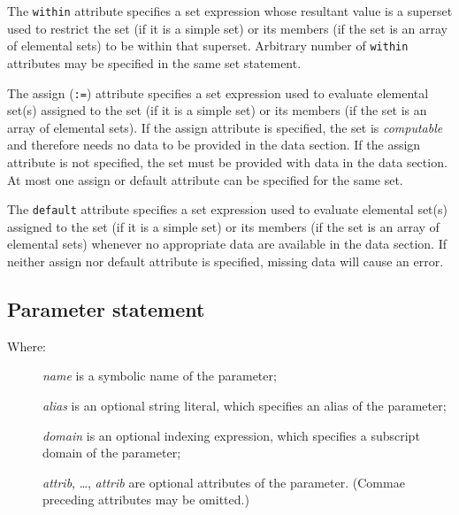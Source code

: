 \documentclass[10pt]{article}
\begin{document}
The {\tt within} attribute specifies a set expression whose resultant
value is a superset used to restrict the set (if it is a simple set) or
its members (if the set is an array of elemental sets) to be within
that superset. Arbitrary number of {\tt within} attributes may be
specified in the same set statement.

The assign ({\tt:=}) attribute specifies a set expression used to
evaluate elemental set(s) assigned to the set (if it is a simple set)
or its members (if the set is an array of elemental sets). If the
assign attribute is specified, the set is {\it computable} and
therefore needs no data to be provided in the data section. If the
assign attribute is not specified, the set must be provided with data
in the data section. At most one assign or default attribute can be
specified for the same set.

The {\tt default} attribute specifies a set expression used to evaluate
elemental set(s) assigned to the set (if it is a simple set) or its
members (if the set is an array of elemental sets) whenever
no appropriate data are available in the data section. If neither
assign nor default attribute is specified, missing data will cause an
error.

\subsection{Parameter statement}

\medskip


\setlength{\leftmargini}{60pt}

\begin{description}
\item[{\rm Where:}\hspace*{23pt}] {\it name} is a symbolic name of the
parameter;
\item[\hspace*{54pt}] {\it alias} is an optional string literal, which
specifies an alias of the parameter;
\item[\hspace*{54pt}] {\it domain} is an optional indexing expression,
which specifies a subscript domain of the parameter;
\item[\hspace*{54pt}] {\it attrib}, \dots, {\it attrib} are optional
attributes of the parameter. (Commae preceding attributes may be
omitted.)
\end{description}
\end{document}
